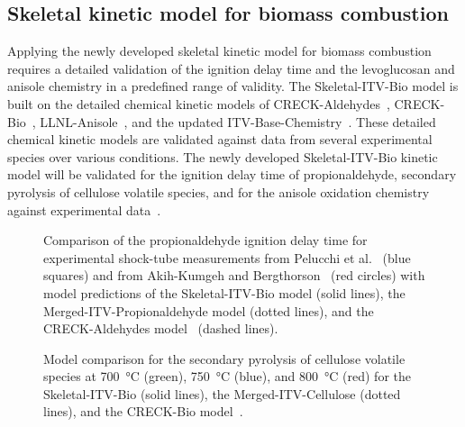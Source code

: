 \begin{refsection}
\subsection{Skeletal kinetic model for biomass combustion}
Applying the newly developed skeletal kinetic model for biomass combustion requires a detailed validation of the ignition delay time and the levoglucosan and anisole chemistry in a predefined range of validity. The Skeletal-ITV-Bio model is built on the detailed chemical kinetic models of CRECK-Aldehydes~\cite{Pelucchi2015}, CRECK-Bio~\cite{Debiagi2016}, LLNL-Anisole~\cite{Wagnon2018}, and the updated ITV-Base-Chemistry~\cite{Langer2023}. These detailed chemical kinetic models are validated against data from several experimental species over various conditions. The newly developed Skeletal-ITV-Bio kinetic model will be validated for the ignition delay time of propionaldehyde, secondary pyrolysis of cellulose volatile species, and for the anisole oxidation chemistry against experimental data~\cite{Pelucchi2015, AkihKumgeh2011, Chen2022}.
\begin{figure}[h]
  \centering
  \hfill
  \hfill
  \caption{Comparison of the propionaldehyde ignition delay time for experimental shock-tube measurements from Pelucchi et al.~\cite{Pelucchi2015} (blue squares) and from Akih-Kumgeh and Bergthorson~\cite{AkihKumgeh2011} (red circles) with model predictions of the Skeletal-ITV-Bio model (solid lines), the Merged-ITV-Propionaldehyde model (dotted lines), and the CRECK-Aldehydes model~\cite{Pelucchi2015} (dashed lines).}
  \label{fig:B1bIDTPropionaldehydeBioMechanism}
\end{figure}
\begin{figure}[b]
  \centering
  \hfill
  \hfill
  \caption{Model comparison for the secondary pyrolysis of cellulose volatile species at \SI{700}{\celsius} (green), \SI{750}{\celsius} (blue), and \SI{800}{\celsius} (red) for the Skeletal-ITV-Bio (solid lines), the Merged-ITV-Cellulose (dotted lines), and the CRECK-Bio model~\cite{Debiagi2016}.}

\end{figure}
\end{refsection}
